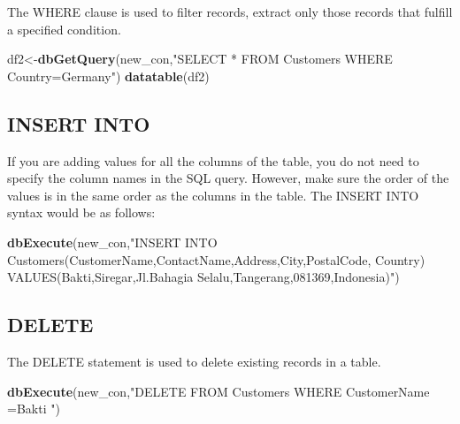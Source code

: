 \documentclass[
]{book}
\newenvironment{Shaded}{\begin{snugshade}}{\end{snugshade}}
\newcommand{\FunctionTok}[1]{\textcolor[rgb]{0.13,0.29,0.53}{\textbf{#1}}}
\newcommand{\NormalTok}[1]{#1}
\newcommand{\OtherTok}[1]{\textcolor[rgb]{0.56,0.35,0.01}{#1}}
\newcommand{\StringTok}[1]{\textcolor[rgb]{0.31,0.60,0.02}{#1}}
\begin{document}
The WHERE clause is used to filter records, extract only those records that fulfill a specified condition.

\begin{Shaded}
\begin{Highlighting}[]
\NormalTok{df2}\OtherTok{\textless{}{-}}\FunctionTok{dbGetQuery}\NormalTok{(new\_con,}\StringTok{"SELECT * }
\StringTok{                         FROM Customers }
\StringTok{                         WHERE Country=\textquotesingle{}Germany\textquotesingle{}"}\NormalTok{)}
\FunctionTok{datatable}\NormalTok{(df2)}
\end{Highlighting}
\end{Shaded}

\hypertarget{insert-into}{%
\subsection{INSERT INTO}\label{insert-into}}

If you are adding values for all the columns of the table, you do not need to specify the column names in the SQL query. However, make sure the order of the values is in the same order as the columns in the table. The INSERT INTO syntax would be as follows:

\begin{Shaded}
\begin{Highlighting}[]
\FunctionTok{dbExecute}\NormalTok{(new\_con,}\StringTok{"INSERT INTO Customers(CustomerName,ContactName,Address,City,PostalCode, Country)}
\StringTok{                   VALUES(\textquotesingle{}Bakti\textquotesingle{},\textquotesingle{}Siregar\textquotesingle{},\textquotesingle{}Jl.Bahagia Selalu\textquotesingle{},\textquotesingle{}Tangerang\textquotesingle{},\textquotesingle{}081369\textquotesingle{},\textquotesingle{}Indonesia\textquotesingle{})"}\NormalTok{)}
\end{Highlighting}
\end{Shaded}

\hypertarget{delete}{%
\subsection{DELETE}\label{delete}}

The DELETE statement is used to delete existing records in a table.

\begin{Shaded}
\begin{Highlighting}[]
\FunctionTok{dbExecute}\NormalTok{(new\_con,}\StringTok{"DELETE FROM Customers}
\StringTok{                   WHERE CustomerName =\textquotesingle{}Bakti\textquotesingle{} "}\NormalTok{)  }
\end{Highlighting}
\end{Shaded}
\end{document}

